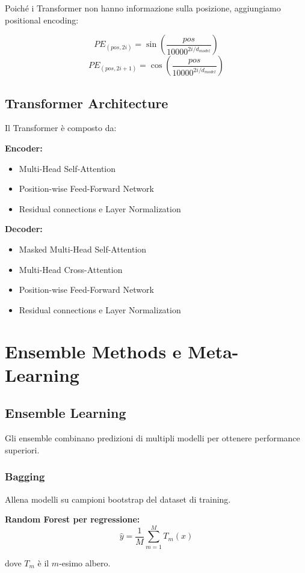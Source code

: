 \documentclass[12pt,a4paper,twoside]{report}
\begin{document}
Poiché i Transformer non hanno informazione sulla posizione, aggiungiamo positional encoding:

$$PE_{(pos,2i)} = \sin\left(\frac{pos}{10000^{2i/d_{model}}}\right)$$
$$PE_{(pos,2i+1)} = \cos\left(\frac{pos}{10000^{2i/d_{model}}}\right)$$

\subsection{Transformer Architecture}

Il Transformer è composto da:

\textbf{Encoder:}
\begin{itemize}
    \item Multi-Head Self-Attention
    \item Position-wise Feed-Forward Network
    \item Residual connections e Layer Normalization
\end{itemize}

\textbf{Decoder:}
\begin{itemize}
    \item Masked Multi-Head Self-Attention
    \item Multi-Head Cross-Attention
    \item Position-wise Feed-Forward Network
    \item Residual connections e Layer Normalization
\end{itemize}

\section{Ensemble Methods e Meta-Learning}

\subsection{Ensemble Learning}

Gli ensemble combinano predizioni di multipli modelli per ottenere performance superiori.

\subsubsection{Bagging}
Allena modelli su campioni bootstrap del dataset di training.

\textbf{Random Forest per regressione:}
$$\hat{y} = \frac{1}{M} \sum_{m=1}^{M} T_m(x)$$

dove $T_m$ è il $m$-esimo albero.
\end{document}

